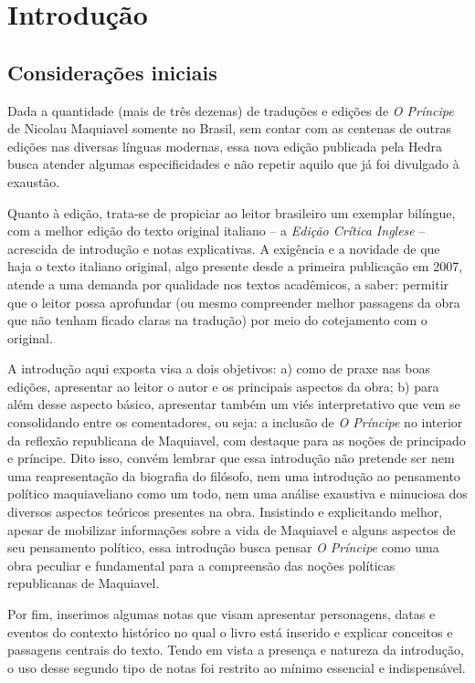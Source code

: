 \chapter*{Introdução}

\section{Considerações iniciais}

Dada a quantidade (mais de três dezenas) de traduções e edições de
\emph{O Príncipe} de Nicolau Maquiavel somente no Brasil, sem contar com
as centenas de outras edições nas diversas línguas modernas, essa nova
edição publicada pela Hedra busca atender algumas especificidades e não
repetir aquilo que já foi divulgado à exaustão.

Quanto à edição, trata-se de propiciar ao leitor brasileiro um exemplar
bilíngue, com a melhor edição do texto original italiano -- a
\emph{Edição Crítica Inglese} -- acrescida de introdução e notas
explicativas. A exigência e a novidade de que haja o texto italiano
original, algo presente desde a primeira publicação em 2007, atende a
uma demanda por qualidade nos textos acadêmicos, a saber: permitir que o
leitor possa aprofundar (ou mesmo compreender melhor passagens da obra
que não tenham ficado claras na tradução) por meio do cotejamento com o
original.

A introdução aqui exposta visa a dois objetivos: a) como de praxe nas
boas edições, apresentar ao leitor o autor e os principais aspectos da
obra; b) para além desse aspecto básico, apresentar também um viés
interpretativo que vem se consolidando entre os comentadores, ou seja: a
inclusão de \emph{O Príncipe} no interior da reflexão republicana de
Maquiavel, com destaque para as noções de principado e príncipe. Dito
isso, convém lembrar que essa introdução não pretende ser nem uma
reapresentação da biografia do filósofo, nem uma introdução ao
pensamento político maquiaveliano como um todo, nem uma análise
exaustiva e minuciosa dos diversos aspectos teóricos presentes na obra.
Insistindo e explicitando melhor, apesar de mobilizar informações sobre
a vida de Maquiavel e alguns aspectos de seu pensamento político, essa
introdução busca pensar \emph{O Príncipe} como uma obra peculiar e
fundamental para a compreensão das noções políticas republicanas de
Maquiavel.

Por fim, inserimos algumas notas que visam apresentar personagens, datas
e eventos do contexto histórico no qual o livro está inserido e explicar
conceitos e passagens centrais do texto. Tendo em vista a presença e
natureza da introdução, o uso desse segundo tipo de notas foi restrito
ao mínimo essencial e indispensável.

